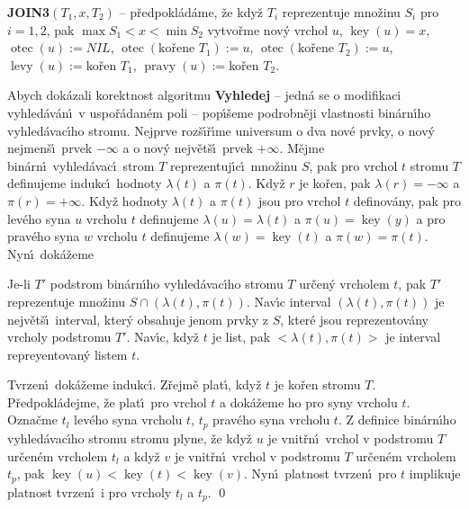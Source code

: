 \documentclass[a4paper,12pt]{article}
\DeclareMathOperator*{\otec}{otec}
\DeclareMathOperator*{\levy}{levy}
\DeclareMathOperator*{\pravy}{pravy}
\DeclareMathOperator*{\key}{key}
\begin{document}
{\bf JOIN3$(T_1,x,T_2)$} -- p\v redpokl\'ad\'ame, \v ze kdy\v z $
T_i$ reprezentuje 
mno\v zinu $S_i$ pro $i=1,2$, pak $\max S_1<x<\min S_2$\newline 
vytvo\v rme nov\'y vrchol $u$, $\key(u)=x$, $\otec(u):=NIL$, \newline 
$\otec(\text{ko\v rene }T_1):=u$, $\otec(\text{ko\v rene }T_2):=u$, \newline 
$\levy(u):=$ko\v ren $T_1$, $\pravy(u):=$ko\v ren $T_2$.
\medskip


\flushpar Abych dok\'azali korektnost algoritmu {\bf Vyhledej} -- 
jedn\'a se o modifikaci vyhled\'av\'an\'\i\ v uspo\v r\'adan\'em poli --
pop\'\i\v seme po\-drobn\v eji vlastnosti bin\'arn\'\i ho vyhled\'avac\'\i ho 
stromu. Nej\-prve roz\v s\'\i \v r\'\i me universum o dva nov\'e prvky, o nov\'y 
nejmen\v s\'\i\ prvek $-\infty$ a o nov\'y nejv\v et\v s\'\i\ prvek $+\infty$. 
M\v ejme bin\'arn\'\i\ vyhled\'avac\'\i\ strom $T$ reprezentuj\'\i c\'\i\ 
mno\v zinu $S$, pak pro vrchol $t$ stromu $T$ definujeme indukc\'\i\ hodnoty $\lambda(t)$ 
a $\pi(t)$. Kdy\v z $r$ je ko\v ren, pak $\lambda(r)=-\infty$ a $\pi(r)=+\infty$. 
Kdy\v z hodnoty $\lambda(t)$ a $\pi(t)$ jsou pro vrchol $t$ definov\'any, pak pro lev\'eho syna $u$ vrcholu $t$ definujeme $\lambda(u)=\lambda(t)$ a $\pi(u)=\key(y)$
a pro prav\'eho syna $w$ vrcholu $t$ definujeme $\lambda(w)=\key(t)$ a $\pi(w)=\pi(t)$.
Nyn\'\i\ dok\'a\v zeme


Je-li $T'$ podstrom bin\'arn\'\i ho vyhled\'avac\'\i ho 
stromu $T$ ur\v cen\'y vrcholem $t$, pak $T'$ reprezentuje mno\v zinu 
$S\cap (\lambda (t),\pi (t))$. Nav\'\i c interval $(\lambda (t),\pi 
(t))$ je nejv\v et\v s\'\i\ interval, 
kter\'y obsahuje jenom prvky z $S$, kter\'e jsou reprezentov\'any 
vrcholy podstromu $T'$. Nav\'\i c, kdy\v z $t$ je list, pak $<\lambda(t),\pi(t)>$ je interval repreyentovan\'y listem $t$.
\endproclaim


Tvrzen\'\i\ dok\'a\v zeme indukc\'\i .  Z\v rejm\v e plat\'\i , 
kdy\v z $t$ je ko\v ren stromu $T$.  P\v redpokl\'adej\-me, \v ze plat\'\i\ pro vrchol 
$t$ a dok\'a\-\v ze\-me ho pro syny vrcholu $t$.  Ozna\v cme $t_l$ lev\'eho syna 
vrcholu $t$, $t_p$ prav\'eho syna vrcholu $t$.  Z definice bin\'arn\'\i ho 
vyhled\'avac\'\i ho stromu stromu plyne, \v ze kdy\v z $u$ je vnit\v rn\'\i\ 
vrchol v podstromu $T$ ur\v cen\'em vrcholem $t_l$ a kdy\v z $v$ je vnit\v rn\'\i\ 
vrchol v podstromu $T$ ur\v cen\'em vrcholem $t_p$, pak 
$\key(u)<\key(t)<\key(v)$.  Nyn\'\i\ platnost tvrzen\'\i\ pro $t$ 
implikuje platnost tvrzen\'\i\ i pro vrcholy $t_l$ a $t_p$.  \qed
\enddemo
\medskip
\end{document}
